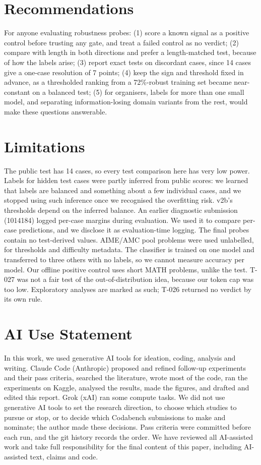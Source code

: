 \documentclass{article}
\begin{document}
\section{Recommendations}
\label{sec:recs}

For anyone evaluating robustness probes: (1) score a known signal as a positive control before trusting any gate, and treat a failed control as no verdict; (2) compare with length in both directions and prefer a length-matched test, because of how the labels arise; (3) report exact tests on discordant cases, since 14 cases give a one-case resolution of 7 points; (4) keep the sign and threshold fixed in advance, as a thresholded ranking from a 72\%-robust training set became near-constant on a balanced test; (5) for organisers, labels for more than one small model, and separating information-losing domain variants from the rest, would make these questions answerable.

\section*{Limitations}

The public test has 14 cases, so every test comparison here has very low power. Labels for hidden test cases were partly inferred from public scores: we learned that labels are balanced and something about a few individual cases, and we stopped using such inference once we recognised the overfitting risk. v2b's thresholds depend on the inferred balance. An earlier diagnostic submission (1014184) logged per-case margins during evaluation. We used it to compare per-case predictions, and we disclose it as evaluation-time logging. The final probes contain no test-derived values. AIME/AMC pool problems were used unlabelled, for thresholds and difficulty metadata. The classifier is trained on one model and transferred to three others with no labels, so we cannot measure accuracy per model. Our offline positive control uses short MATH problems, unlike the test. T-027 was not a fair test of the out-of-distribution idea, because our token cap was too low. Exploratory analyses are marked as such; T-026 returned no verdict by its own rule.

\section*{AI Use Statement}

In this work, we used generative AI tools for ideation, coding, analysis and writing. Claude Code (Anthropic) proposed and refined follow-up experiments and their pass criteria, searched the literature, wrote most of the code, ran the experiments on Kaggle, analysed the results, made the figures, and drafted and edited this report. Grok (xAI) ran some compute tasks. We did not use generative AI tools to set the research direction, to choose which studies to pursue or stop, or to decide which Codabench submissions to make and nominate; the author made these decisions. Pass criteria were committed before each run, and the git history records the order. We have reviewed all AI-assisted work and take full responsibility for the final content of this paper, including AI-assisted text, claims and code.
\end{document}
